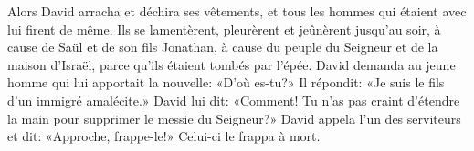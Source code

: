 Alors David arracha et déchira ses vêtements,
	et tous les hommes qui étaient avec lui firent de même. 
Ils se lamentèrent, pleurèrent et jeûnèrent jusqu’au soir,
	à cause de Saül et de son fils Jonathan,
	à cause du peuple du Seigneur et de la maison d’Israël,
	parce qu’ils étaient tombés par l’épée.
David demanda au jeune homme qui lui apportait la nouvelle:
	«D’où es-tu?»
	Il répondit: «Je suis le fils d’un immigré amalécite.»
David lui dit:
	«Comment! Tu n’as pas craint d’étendre la main pour supprimer le messie du Seigneur?»
David appela l’un des serviteurs et dit: «Approche, frappe-le!»
	Celui-ci le frappa à mort.
